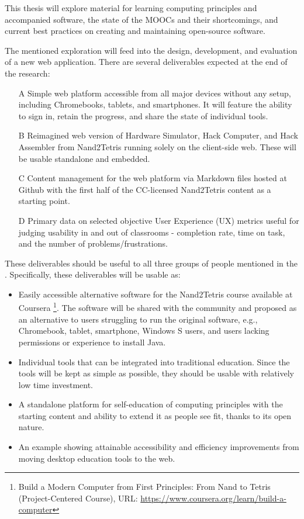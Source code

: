 \documentclass[a4paper,12pt]{report}
\begin{document}
This thesis will explore material for learning computing principles and accompanied software, the state of the MOOCs and their shortcomings, and current best practices on creating and maintaining open-source software.

The mentioned exploration will feed into the design, development, and evaluation of a new web application.
There are several deliverables expected at the end of the research:

\begin{enumerate}
    \item[A] Simple web platform accessible from all major devices without any setup, including Chromebooks, tablets, and smartphones. It will feature the ability to sign in, retain the progress, and share the state of individual tools.
    \item[B] Reimagined web version of Hardware Simulator, Hack Computer, and Hack Assembler from Nand2Tetris running solely on the client-side web. These will be usable standalone and embedded.
    \item[C] Content management for the web platform via Markdown files hosted at Github with the first half of the CC-licensed Nand2Tetris content as a starting point.
    \item[D] Primary data on selected objective User Experience (UX) metrics useful for judging usability in and out of classrooms - completion rate, time on task, and the number of problems/frustrations. 
\end{enumerate}

These deliverables should be useful to all three groups of people mentioned in the . Specifically, these deliverables will be usable as:

\begin{itemize}
    \item Easily accessible alternative software for the Nand2Tetris course available at Coursera \footnote{Build a Modern Computer from First Principles: From Nand to Tetris (Project-Centered Course), URL: \url{https://www.coursera.org/learn/build-a-computer}}. The software will be shared with the community and proposed as an alternative to users struggling to run the original software, e.g., Chromebook, tablet, smartphone, Windows S users, and users lacking permissions or experience to install Java.
    \item Individual tools that can be integrated into traditional education. Since the tools will be kept as simple as possible, they should be usable with relatively low time investment.
    \item A standalone platform for self-education of computing principles with the starting content and ability to extend it as people see fit, thanks to its open nature.
    \item An example showing attainable accessibility and efficiency improvements from moving desktop education tools to the web.
\end{itemize}
\end{document}
